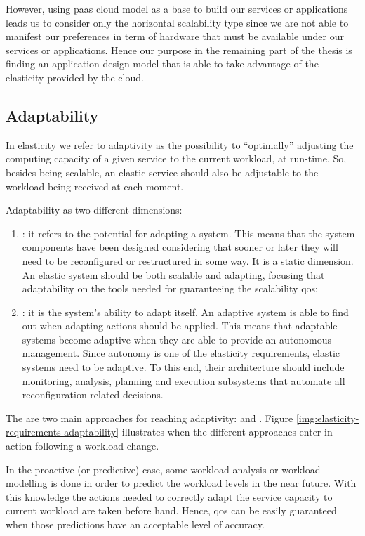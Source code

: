 However, using \ac{paas} cloud model as a base to build our services or applications leads us to consider
only the horizontal scalability type since we are not able to manifest our preferences in term of hardware
that must be available under our services or applications. Hence our purpose in the remaining part of the
thesis is finding an application design model that is able to take advantage of the elasticity
provided by the cloud.

\subsection{Adaptability}
\label{sec:elasticity-requirements-adaptability}
In elasticity we refer to adaptivity as the possibility to ``optimally'' adjusting the computing capacity
of a given service to the current workload, at run-time. So, besides being scalable, an elastic service
should also be adjustable to the workload being received at each moment.

Adaptability as two different dimensions:

\begin{enumerate}
	\item{: it refers to the potential for adapting a system. This means that the
		system components have been designed considering that sooner or later they will need to be
		reconfigured or restructured in some way. It is a static dimension. An elastic system should be
		both scalable and adapting, focusing that adaptability on the tools needed for guaranteeing the
		scalability \ac{qos};}
	\item{: it is the system's ability to adapt itself. An adaptive system is able
		to find out when adapting actions should be applied. This means that adaptable systems become
		adaptive when they are able to provide an autonomous management. Since autonomy is one of the
		elasticity requirements, elastic systems need to be adaptive. To this end, their architecture
		should include monitoring, analysis, planning and execution subsystems that automate all
		reconfiguration-related decisions.}
\end{enumerate}

The are two main approaches for reaching adaptivity:  and .
Figure \ref{img:elasticity-requirements-adaptability} illustrates when the different approaches
enter in action following a workload change.

In the proactive (or predictive) case, some workload analysis or workload modelling is done in order
to predict the workload levels in the near future. With this knowledge the actions needed to correctly
adapt the service capacity to current workload are taken before hand. Hence, \ac{qos} can be easily
guaranteed when those predictions have an acceptable level of accuracy.

